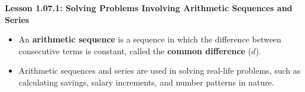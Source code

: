\begin{center}
\textbf{Lesson 1.07.1: Solving Problems Involving Arithmetic Sequences and Series}
\end{center}

\vspace*{-1.5ex}

\begin{itemize}
    \item An \textbf{arithmetic sequence} is a sequence in which the difference between consecutive terms is constant, called the \textbf{common difference} (\(d\)).
    \item Arithmetic sequences and series are used in solving real-life problems, such as calculating savings, salary increments, and number patterns in nature.
\end{itemize}
